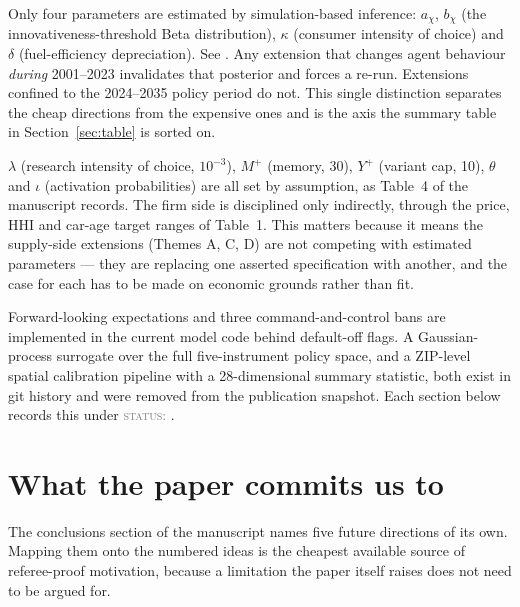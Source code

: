 \documentclass[11pt]{article}
\newcommand{\status}[1]{\textcolor{gray}{\textsc{status:} #1}}
\begin{document}
\begin{description}[leftmargin=1.5em]
\item[The calibration is the bottleneck.] Only four parameters are
  estimated by simulation-based inference: $a_\chi$, $b_\chi$
  (the innovativeness-threshold Beta distribution), $\kappa$ (consumer
  intensity of choice) and $\delta$ (fuel-efficiency depreciation). See
  .
  Any extension that changes agent behaviour \emph{during} 2001--2023
  invalidates that posterior and forces a re-run. Extensions confined to the
  2024--2035 policy period do not. This single distinction separates the
  cheap directions from the expensive ones and is the axis the summary table
  in Section~\ref{sec:table} is sorted on.

\item[No firm behavioural parameter is estimated.] $\lambda$ (research
  intensity of choice, $10^{-3}$), $M^+$ (memory, 30), $Y^+$ (variant cap,
  10), $\theta$ and $\iota$ (activation probabilities) are all set by
  assumption, as Table~4 of the manuscript records. The firm side is
  disciplined only indirectly, through the price, HHI and car-age target
  ranges of Table~1. This matters because it means the supply-side
  extensions (Themes A, C, D) are not competing with estimated parameters
  --- they are replacing one asserted specification with another, and the
  case for each has to be made on economic grounds rather than fit.

\item[Several directions are already partly built.] Forward-looking
  expectations and three command-and-control bans are implemented in the
  current model code behind default-off flags. A Gaussian-process surrogate
  over the full five-instrument policy space, and a ZIP-level spatial
  calibration pipeline with a 28-dimensional summary statistic, both exist
  in git history and were removed from the publication snapshot. Each
  section below records this under \status{}.
\end{description}

\section{What the paper commits us to}
\label{sec:commitments}

The conclusions section of the manuscript names five future directions of
its own. Mapping them onto the numbered ideas is the cheapest available
source of referee-proof motivation, because a limitation the paper itself
raises does not need to be argued for.
\end{document}
